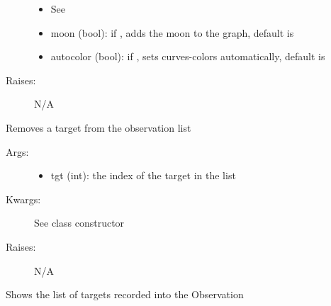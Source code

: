 \documentclass[letterpaper,10pt,english]{sphinxmanual}
\begin{document}
\begin{fulllineitems}
\begin{fulllineitems}
\begin{description}
\begin{itemize}
\item {} 
See 

\item {} 
moon (bool): if , adds the moon to the graph, default is 

\item {} 
autocolor (bool): if , sets curves-colors automatically, default is 

\end{itemize}

\item[{Raises:}] \leavevmode
N/A

\end{description}

\end{fulllineitems}


\begin{fulllineitems}
\label{astroobs:astroobs.Observation.rem_target}
Removes a target from the observation list
\begin{description}
\item[{Args:}] \leavevmode\begin{itemize}
\item {} 
tgt (int): the index of the target in the  list

\end{itemize}

\item[{Kwargs:}] \leavevmode
See class constructor

\item[{Raises:}] \leavevmode
N/A

\end{description}

\end{fulllineitems}


\begin{fulllineitems}
\label{astroobs:astroobs.Observation.targets}
Shows the list of targets recorded into the Observation

\end{fulllineitems}



\end{fulllineitems}
\end{document}
